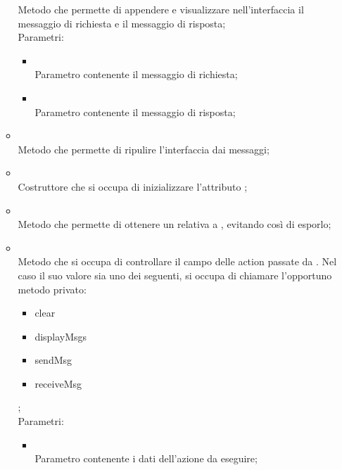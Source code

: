 \begin{itemize}
\begin{itemize}
		Metodo che permette di appendere e visualizzare nell'interfaccia il messaggio di richiesta e il messaggio di risposta;\\
		Parametri:
		\begin{itemize}
			\item {} \\
			Parametro contenente il messaggio di richiesta;
			\item {} \\
			Parametro contenente il messaggio di risposta;
		\end{itemize}
		\item[]  \\
		Metodo che permette di ripulire l'interfaccia dai messaggi;\\
		\item[]  \\
		Costruttore che si occupa di inizializzare l'attributo ;\\
		\item[]  \\
		Metodo che permette di ottenere un  relativa a , evitando così di esporlo;\\
		\item[]  \\
		Metodo che si occupa di controllare il campo  delle action passate da . Nel caso il suo valore sia uno dei seguenti, si occupa di chiamare l'opportuno metodo privato:
\begin{itemize}
\item clear
\item displayMsgs
\item sendMsg
\item receiveMsg
\end{itemize};\\
		Parametri:
		\begin{itemize}
			\item {} \\
			Parametro contenente i dati dell'azione da eseguire;
		\end{itemize}
	\end{itemize}
\end{itemize}
\FloatBarrier


